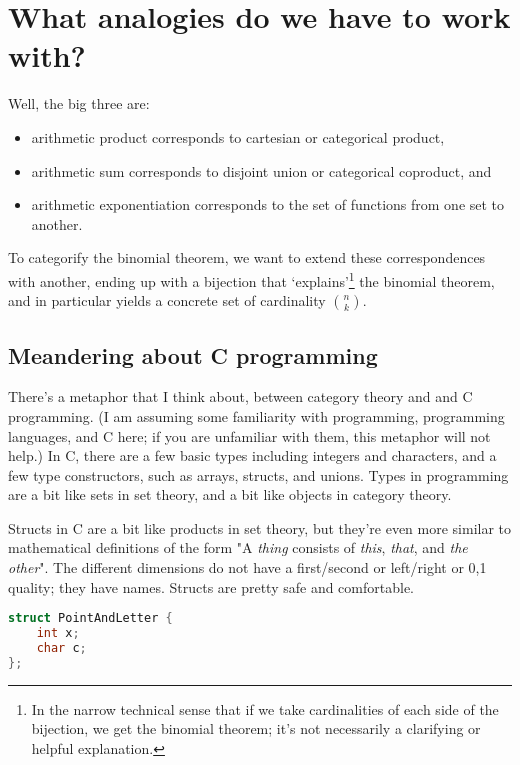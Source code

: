 \documentclass{proc-l}
\theoremstyle{definition}
\theoremstyle{remark}
\numberwithin{equation}{section}
\begin{document}
\section{What analogies do we have to work with?}

Well, the big three are:
\begin{itemize}
    \item arithmetic product corresponds to cartesian or categorical product,
    \item arithmetic sum corresponds to disjoint union or categorical coproduct, and
    \item arithmetic exponentiation corresponds to the set of functions from one set to another.
\end{itemize}

To categorify the binomial theorem, we want to extend these correspondences with another, ending up with a bijection that `explains'\footnote{In the narrow technical sense that if we take cardinalities of each side of the bijection, we get the
binomial theorem; it's not necessarily a clarifying or helpful explanation.} the binomial theorem, and in particular yields a concrete set of cardinality \({n \choose k}\).

\subsection{Meandering about C programming}

There's a metaphor that I think about, between category theory and and C programming.
(I am assuming some familiarity with programming, programming languages, and C here;
if you are unfamiliar with them, this metaphor will not help.)
In C, there are a few basic types including integers and characters, and a few type constructors, such as arrays,
structs, and unions. Types in programming are a bit like sets in set theory, and a bit like objects in category theory.

Structs in C are a bit like products in set theory, but they're even more similar to mathematical definitions of the form "A \emph{thing} consists of \emph{this}, \emph{that}, and \emph{the other}". The different dimensions do not have a first/second or left/right or 0,1 quality; they have names. Structs are pretty safe and comfortable. 

\begin{lstlisting}[language=C]
struct PointAndLetter {
    int x;
    char c;
};
\end{lstlisting}
\end{document}
